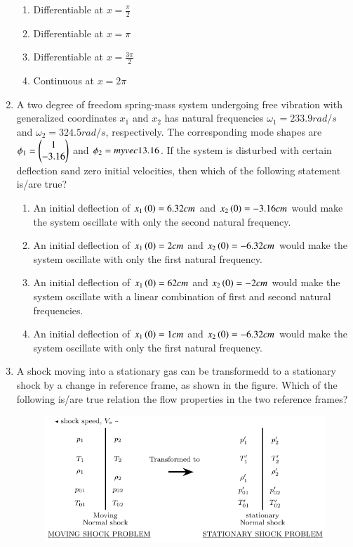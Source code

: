 \documentclass[journal]{IEEEtran}
\begin{document}
\begin{enumerate}
\begin{enumerate}
                 \item Differentiable at $x=\frac{\pi}{2}$
                 \item Differentiable at $x=\pi$
                 \item Differentiable at $x=\frac{3\pi}{2}$
                 \item Continuous at $x=2\pi$
             \end{enumerate}
	\item  A two degree of freedom spring-mass system undergoing free vibration with generalized coordinates $x_1$ and $x_2$ has natural frequencies $\omega_1=233.9rad/s$ and $\omega_2=324.5rad/s$, respectively. The corresponding mode shapes are $\phi_1=\begin{pmatrix}1\\-3.16\end{pmatrix}$ and $\phi_2=myvec{1\\3.16}$. If the system is disturbed with certain deflection sand zero initial velocities, then which of the following statement is/are true?
		\begin{enumerate}
			\item An initial deflection of $ x_1\left(0\right)=6.32cm$ and $x_2\left(0\right)=-3.16cm$ would make the system oscillate with only the second natural frequency. 
			\item An initial deflection of $ x_1\left(0\right)=2cm$ and $x_2\left(0\right)=-6.32cm$ would make the system oscillate with only the first natural frequency. 
			\item  An initial deflection of $ x_1\left(0\right)=62cm$ and $x_2\left(0\right)=-2cm$ would make the system oscillate with a linear combination of first and second natural frequencies. 
	        \item  An initial deflection of $ x_1\left(0\right)=1cm$ and $x_2\left(0\right)=-6.32cm$ would make the system oscillate with only the first natural frequency. 
        	\end{enumerate}
	\item A shock moving into a stationary gas can be transformedd to a stationary shock by a change in reference frame, as shown in the figure. Which of the following is/are true relation the flow properties in the two  reference frames?
		\newpage
\begin{figure}[ht!]
	    \centering
	    \includegraphics[width=0.5\linewidth]{fig/fig3.pdf}

\end{figure}
\end{enumerate}
\end{document}
